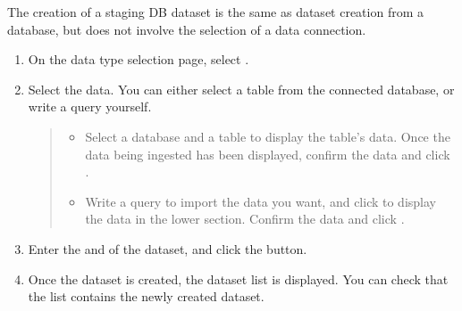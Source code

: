 \documentclass[letterpaper,10pt,english]{sphinxmanual}
\begin{document}
The creation of a staging DB dataset is the same as dataset creation from a database, but does not involve the selection of a data connection.
\begin{enumerate}
\def\theenumi{\arabic{enumi}}
\def\labelenumi{\theenumi .}
\makeatletter\def\p@enumii{\p@enumi \theenumi .}\makeatother
\item {} 
On the data type selection page, select .

\item {} 
Select the data. You can either select a table from the connected database, or write a query yourself.
\begin{quote}

\begin{figure}[H]
\centering

\noindent{}
\end{figure}
\begin{itemize}
\item {} 
 Select a database and a table to display the table’s data. Once the data being ingested has been displayed, confirm the data and click .

\item {} 
 Write a query to import the data you want, and click  to display the data in the lower section. Confirm the data and click .

\end{itemize}
\end{quote}

\item {} 
Enter the  and  of the dataset, and click the  button.
\begin{quote}

\begin{figure}[H]
\centering

\noindent{}
\end{figure}
\end{quote}

\item {} 
Once the dataset is created, the dataset list is displayed. You can check that the list contains the newly created dataset.
\begin{quote}

\begin{figure}[H]
\centering

\noindent{}
\end{figure}
\end{quote}

\end{enumerate}
\end{document}
